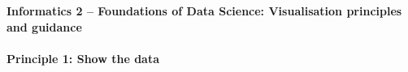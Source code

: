 \documentclass[10pt]{article}
\begin{document}
\raggedright
\pagestyle{empty}

\begin{center}
  \large\textbf{Informatics 2 -- Foundations of Data Science: Visualisation
    principles and guidance}
\end{center}


\setlength{\columnseprule}{.2pt}
\begin{multicols}{3}
\paragraph{Principle 1: Show the data} 


\end{multicols}
\end{document}
